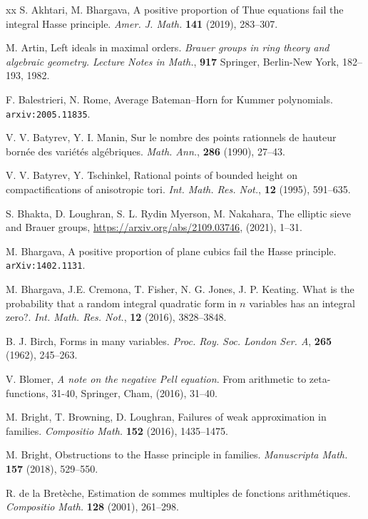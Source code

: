 \documentclass[a4paper,12pt,reqno]{amsart}
\numberwithin{equation}{section} \numberwithin{figure}{section}
\renewcommand{\#}{\sharp}
\theoremstyle{definition}
\numberwithin{lemma}{section}
\begin{document}
\begin{thebibliography}{xx}
{S. Akhtari, M. Bhargava}, 
{A positive proportion of {T}hue equations fail the integral
              {H}asse principle}.
\textit{Amer. J. Math.} \textbf{141} (2019), 283--307.

M. Artin,
{Left ideals in maximal orders}.
\emph{Brauer groups in ring theory and algebraic geometry.
Lecture Notes in Math.}, {\bf917} Springer, Berlin-New York, 182--193, 1982.

F. Balestrieri, N. Rome,
{Average Bateman--Horn for Kummer polynomials}.
\texttt{arxiv:2005.11835}.

V. V. Batyrev, Y. I. Manin,
{Sur le nombre des points rationnels
de hauteur born\'{e}e des vari\'{e}t\'{e}s alg\'{e}briques}.
\emph{Math. Ann.}, {\bf 286} (1990), 27--43.

V. V. Batyrev, Y. Tschinkel, 
{Rational points of bounded height on compactifications of anisotropic tori}.
\emph{Int. Math. Res. Not.}, {\bf 12} (1995), 591--635.

{S. Bhakta, D. Loughran, S. L. Rydin Myerson, M. Nakahara},
The elliptic sieve and Brauer groups,
\url{https://arxiv.org/abs/2109.03746}, (2021), 1--31.

{M. Bhargava},
{A positive proportion of plane cubics fail the Hasse principle}.
\texttt{arXiv:1402.1131}.

{M. Bhargava, J.E. Cremona, T. Fisher, N. G. Jones, J. P. Keating}.
{What is the probability that a random integral quadratic form
              in {$n$} variables has an integral zero?}.
\emph{Int. Math. Res. Not.}, {\bf 12} (2016), 3828--3848.
 
B. J. Birch,
{Forms in many variables}.
\emph{Proc. Roy. Soc. London Ser. A}, {\bf265} (1962), 245--263.

V. Blomer, 
\emph{A note on the negative Pell equation}. From arithmetic to zeta-functions,  31-40, Springer, Cham,
(2016), 31--40.
 
{M. Bright, T. Browning, D. Loughran}, 
{Failures of weak approximation in families}.
\emph{Compositio Math.} {\bf 152} (2016), 1435--1475.
  
{M. Bright}, 
{Obstructions to the {H}asse principle in families}.
\emph{Manuscripta Math.} {\bf 157} (2018), 529--550.
    
{R. de la Bret\`eche},
{Estimation de sommes multiples de fonctions arithm\'{e}tiques}.
\emph{Compositio Math.} {\bf 128} (2001), 261--298.
 

\end{thebibliography}
\end{document}
